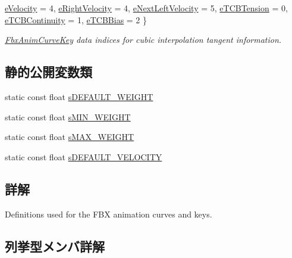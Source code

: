 \begin{DoxyCompactItemize}
\hyperlink{class_fbx_anim_curve_def_a3be261d961f8226235529b148cf80300a8732f3303563dd6d7e92373e6e930648}{e\+Velocity} = 4, 
\hyperlink{class_fbx_anim_curve_def_a3be261d961f8226235529b148cf80300a4009b9f2bd63546ecd6ce63e5a60701f}{e\+Right\+Velocity} = 4, 
\hyperlink{class_fbx_anim_curve_def_a3be261d961f8226235529b148cf80300af617635230401e91d520361c9b02db41}{e\+Next\+Left\+Velocity} = 5, 
\newline
\hyperlink{class_fbx_anim_curve_def_a3be261d961f8226235529b148cf80300a38129a423990a42f94187b77ab041caa}{e\+T\+C\+B\+Tension} = 0, 
\hyperlink{class_fbx_anim_curve_def_a3be261d961f8226235529b148cf80300a5544ce65720f37d5a2620dc32556b2ba}{e\+T\+C\+B\+Continuity} = 1, 
\hyperlink{class_fbx_anim_curve_def_a3be261d961f8226235529b148cf80300a4ed5dbb6b725478205a3c750c20790d3}{e\+T\+C\+B\+Bias} = 2
 \}\begin{DoxyCompactList}\small\item\em \hyperlink{class_fbx_anim_curve_key}{Fbx\+Anim\+Curve\+Key} data indices for cubic interpolation tangent information. \end{DoxyCompactList}
\end{DoxyCompactItemize}
\subsection*{静的公開変数類}
\begin{DoxyCompactItemize}
\item 
static const float \hyperlink{class_fbx_anim_curve_def_a6fd6b3907962eba0b1e71f28b55fad9d}{s\+D\+E\+F\+A\+U\+L\+T\+\_\+\+W\+E\+I\+G\+HT}
\item 
static const float \hyperlink{class_fbx_anim_curve_def_a469319cefa59b62fd38985b837e49d07}{s\+M\+I\+N\+\_\+\+W\+E\+I\+G\+HT}
\item 
static const float \hyperlink{class_fbx_anim_curve_def_ad0e9ffa9198f867a8eec3b78d7363438}{s\+M\+A\+X\+\_\+\+W\+E\+I\+G\+HT}
\item 
static const float \hyperlink{class_fbx_anim_curve_def_abebd0a6078f18802836059fdefb36862}{s\+D\+E\+F\+A\+U\+L\+T\+\_\+\+V\+E\+L\+O\+C\+I\+TY}
\end{DoxyCompactItemize}


\subsection{詳解}
Definitions used for the F\+BX animation curves and keys. 

\subsection{列挙型メンバ詳解}
\mbox{\label{class_fbx_anim_curve_def_a52885abd392ac8ac3da94bafc5fddd64}} 
